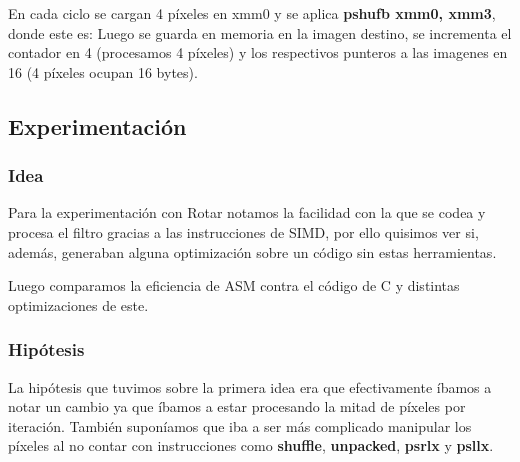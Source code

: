 En cada ciclo se cargan 4 píxeles en xmm0 y se aplica \textbf{pshufb xmm0, xmm3}, donde este es:
Luego se guarda en memoria en la imagen destino, se incrementa el contador en 4 (procesamos 4 píxeles) y los respectivos punteros a las imagenes en 16 (4 píxeles ocupan 16 bytes).	
	
	
\subsection{Experimentación}

\subsubsection{Idea}	
\par{Para la experimentación con Rotar notamos la facilidad con la que se codea y procesa el filtro gracias a las instrucciones de SIMD, por ello quisimos ver si, además, generaban alguna optimización sobre un código sin estas herramientas.}
\par{Luego comparamos la eficiencia de ASM contra el código de C y distintas optimizaciones de este.}

\subsubsection{Hipótesis}
\par{La hipótesis que tuvimos sobre la primera idea era que efectivamente íbamos a notar un cambio ya que íbamos a estar procesando la mitad de píxeles por iteración. También suponíamos que iba a ser más complicado manipular los píxeles al no contar con instrucciones como \textbf{shuffle}, \textbf{unpacked}, \textbf{psrlx} y \textbf{psllx}.}
	
